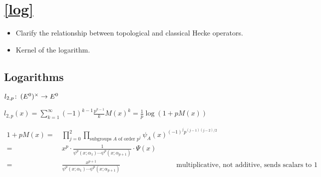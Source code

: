\documentclass{rs}
\theoremstyle{definition}
\theoremstyle{remark}
\def\co{\colon\thinspace}
\newcommand{\mb}[1]{\mathbb{#1}}
\newcommand{\BZ}{{\mb Z}}
\newcommand{\A}{\alpha}
\newcommand{\G}{\Gamma}
\numberwithin{equation}{section}
\numberwithin{thm}{section}
\begin{document}
% 
% 
% 
% 
\section{\href{http://arxiv.org/abs/math/0407022}{[log]}}

\begin{itemize}
 \item Clarify the relationship between topological and classical Hecke operators.  

 \item Kernel of the logarithm.  
\end{itemize}


% 
% 


\subsection{Logarithms}

$l_{2,p} \co (E^0)^\times \to E^0$ 

$l_{2,p}(x) = \sum_{k=1}^\infty (-1)^{k-1} \frac{p^{k-1}}{k} M(x)^k = \frac{1}{p} \log(1 + p M(x))$ 

\begin{equation*}
\begin{split}
 1 + p M(x) = & ~ \prod_{j=0}^2 \prod_{\text{subgroups $A$ of order $p^j$}} \psi_A(x)^{(-1)^j p^{(j-1)(j-2)/2}} \\
            = & ~ x^p \cdot \frac{1}{\psi^p(x;\A_1) \cdots \psi^p(x;\A_{p+1})} \cdot \Psi(x) \\
            = & ~ \frac{x^{p+1}}{\psi^p(x;\A_1) \cdots \psi^p(x;\A_{p+1})} \qquad\qquad\qquad\qquad \text{multiplicative, not additive, sends scalars to 1} 
\end{split}
\end{equation*}
\end{document}
